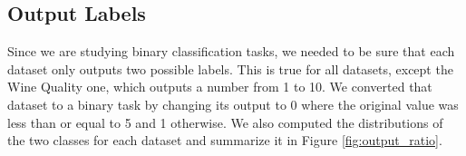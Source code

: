 \documentclass{article}
\begin{document}
\subsection{Output Labels}

Since we are studying binary classification tasks, we needed to be sure that each dataset only outputs two possible labels. This is true for all datasets, except the Wine Quality one, which outputs a number from 1 to 10. We converted that dataset to a binary task by changing its output to 0 where the original value was less than or equal to 5 and 1 otherwise. We also computed the distributions of the two classes for each dataset and summarize it in Figure \ref{fig:output_ratio}.

\begin{figure}%
\centering
{}%
\hspace{8pt}%
 \\

\end{figure}
\end{document}
